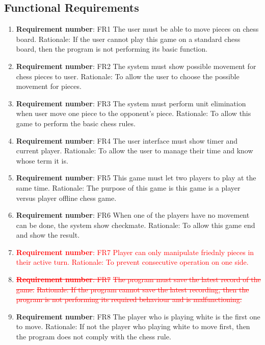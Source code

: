 \documentclass[12pt, titlepage]{article}
\begin{document}
\subsection{Functional Requirements}
\begin{enumerate}
\item \textbf{Requirement number}: FR1 \newline
The user must be able to move pieces on chess board. \newline
Rationale: If the user cannot play this game on a standard chess board, then the program is not performing its basic function.
\item \textbf{Requirement number}: FR2 \newline
The system must show possible movement for chess pieces to user. \newline
Rationale: To allow the user to choose the possible movement for pieces. 
\item \textbf{Requirement number}: FR3 \newline
The system must perform unit elimination when user move one piece to the opponent’s piece.\newline
Rationale: To allow this game to perform the basic chess rules.
\item \textbf{Requirement number}: FR4 \newline
The user interface must show timer and current player. \newline
Rationale: To allow the user to manage their time and know whose term it is. 
\item \textbf{Requirement number}: FR5 \newline
This game must let two players to play at the same time. \newline
Rationale: The purpose of this game is this game is a player versus player offline chess game.
\item \textbf{Requirement number}: FR6 \newline
When one of the players have no movement can be done, the system show checkmate.\newline
Rationale: To allow this game end and show the result.
\item
\textcolor{red}{
\textbf{Requirement number}: FR7\newline
Player can only manipulate friednly pieces in their active turn.\newline
Rationale: To prevent consecutive operation on one side.}
\item
\textcolor{red}{
\sout{\textbf{Requirement number}: FR7}\newline
\sout{The program must save the latest record of the game.}\newline
\sout{Rationale: If the program cannot save the latest recording, then the program is not performing its required behaviour and is malfunctioning.}}
\item \textbf{Requirement number}: FR8\newline
The player who is playing white is the first one to move.\newline
Rationale: If not the player who playing white to move first, then the program does not comply with the chess rule.
 

\end{enumerate}
\end{document}

